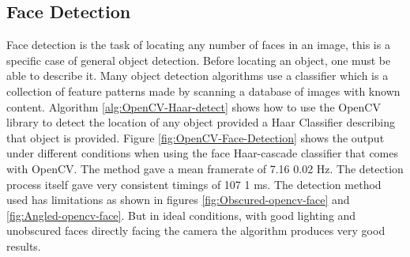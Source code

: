 \documentclass[english]{IEEEtran}
\theoremstyle{plain}
\begin{document}
\subsection{Face Detection}

Face detection is the task of locating any number of faces in an image,
this is a specific case of general object detection. Before locating
an object, one must be able to describe it. Many object detection
algorithms use a classifier which is a collection of feature patterns
made by scanning a database of images with known content. Algorithm
\ref{alg:OpenCV-Haar-detect} shows how to use the OpenCV library
to detect the location of any object provided a Haar Classifier describing
that object is provided. Figure \ref{fig:OpenCV-Face-Detection} shows
the output under different conditions when using the face Haar-cascade
classifier that comes with OpenCV. The method gave a mean framerate
of 7.16 \textpm{} 0.02 Hz. The detection process itself gave very
consistent timings of 107 \textpm{} 1 ms. The detection method used
has limitations as shown in figures \ref{fig:Obscured-opencv-face}
and \ref{fig:Angled-opencv-face}. But in ideal conditions, with good
lighting and unobscured faces directly facing the camera the algorithm
produces very good results.
\end{document}
